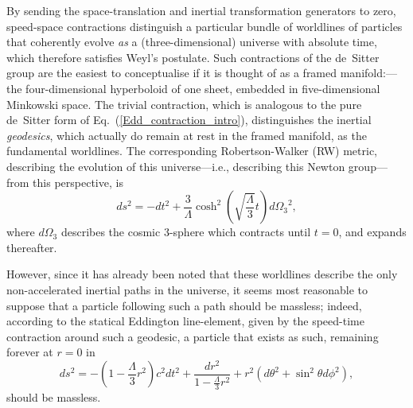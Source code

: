 By sending the space-translation and inertial transformation generators to zero, speed-space contractions distinguish a particular bundle of worldlines of particles that coherently evolve \textit{as} a (three-dimensional) universe with absolute time, which therefore satisfies Weyl's postulate. Such contractions of the de~Sitter group are the easiest to conceptualise if it is thought of as a framed manifold:---the four-dimensional hyperboloid of one sheet, embedded in five-dimensional Minkowski space. The trivial contraction, which is analogous to the pure de~Sitter form of Eq.~(\ref{Edd_contraction_intro}), distinguishes the inertial \textit{geodesics}, which actually do remain at rest in the framed manifold, as the fundamental worldlines. The corresponding Robertson-Walker (RW) metric, describing the evolution of this universe---i.e., describing this Newton group---from this perspective, is
\begin{equation}
ds^2=-dt^2+\frac{3}{\Lambda}\cosh^2\left(\sqrt{\frac{\Lambda}{3}}t\right){d\Omega_3}^2,\label{dS_comoving_univ_intro}
\end{equation}
where $d\Omega_3$ describes the cosmic 3-sphere which contracts until $t=0$, and expands thereafter.

However, since it has already been noted that these worldlines describe the only non-accelerated inertial paths in the universe, it seems most reasonable to suppose that a particle following such a path should be massless; indeed, according to the statical Eddington line-element, given by the speed-time contraction around such a geodesic, a particle that exists as such, remaining forever at $r=0$ in
\begin{equation}
ds^2=-\left(1-\frac{\Lambda}{3}r^2\right)c^2dt^2+\frac{dr^2}{1-\frac{\Lambda}{3}r^2}+r^2(d\theta^2+\sin^2\theta{d\phi^2}),\label{deSitter_statical_intro}
\end{equation}
should be massless. 

